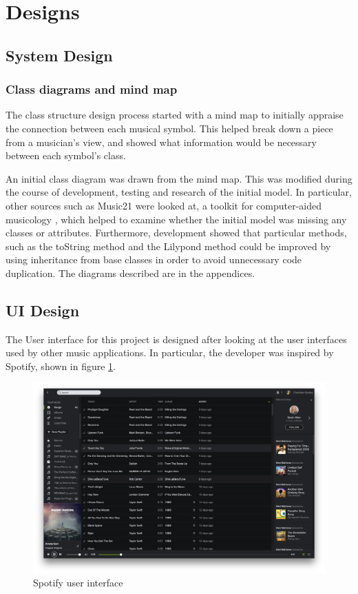 \section{Designs}
\subsection{System Design}
\subsubsection{Class diagrams and mind map}
The class structure design process started with a mind map to initially appraise the connection between each musical symbol. This helped break down a piece from a musician's view, and showed what information would be necessary between each symbol's class.

An initial class diagram was drawn from the mind map. This was modified during the course of development, testing and research of the initial model. In particular, other sources such as Music21 were looked at, a toolkit for computer-aided musicology \parencite{Music21}, which helped to examine whether the initial model was missing any classes or attributes. Furthermore, development showed that particular methods, such as the toString method and the Lilypond method could be improved by using inheritance from base classes in order to avoid unnecessary code duplication. The diagrams described are in the appendices. 
\subsection{UI Design}
The User interface for this project is designed after looking at the user interfaces used by other music applications. In particular, the developer was inspired by Spotify, shown in figure \ref{fig:spotify}.

\begin{figure}[h]
    \centering
    \includegraphics[width=\textwidth]{screen.png}
    \caption{Spotify user interface}
    \label{fig:spotify}
\end{figure}
